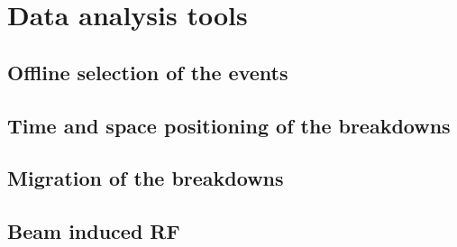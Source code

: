 \chapter[Data analysis tools]{Data analysis tools}

\section[Offline selection of the events]{Offline selection of the events}

\section[Time and space positioning of the breakdowns]{Time and space positioning of the breakdowns}

\section[Migration of the breakdowns]{Migration of the breakdowns}

\section[Beam induced RF]{Beam induced RF}
